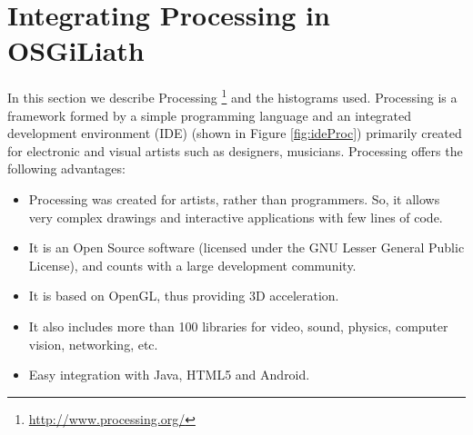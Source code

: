 \section{Integrating Processing in OSGiLiath}
\label{sec:processing}

\noindent In this section we describe Processing
\footnote{\url{http://www.processing.org/}} and the histograms
used. %
 Processing \cite{PROCESSING} is a framework formed by a simple
 programming language and an integrated development environment (IDE)
 (shown in Figure \ref{fig:ideProc}) primarily created for electronic
 and visual artists such as designers, musicians. Processing offers
 the following advantages: %

\begin{itemize}
\item Processing was created for artists, rather than programmers. So, it allows very complex drawings and interactive applications with few lines of code.
\item It is an Open Source software (licensed under the GNU Lesser General Public License), and counts with a large development community.
\item It is based on OpenGL, thus providing 3D acceleration.
\item It also includes more than 100 libraries for video, sound, physics, computer vision, networking, etc.
\item Easy integration with Java, HTML5 and Android.
\end{itemize}

